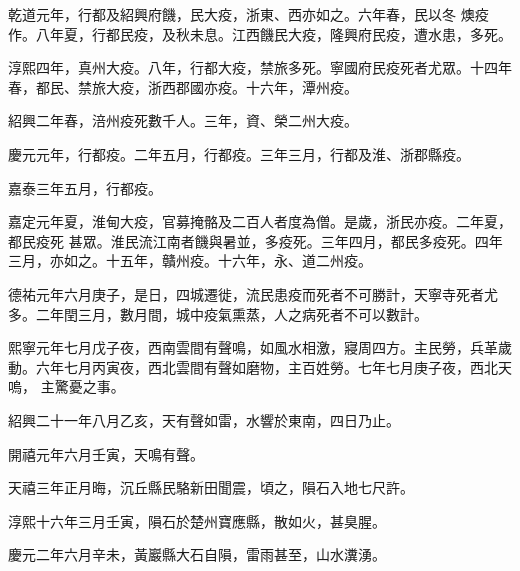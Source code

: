 \begin{pinyinscope}
 乾道元年，行都及紹興府饑，民大疫，浙東、西亦如之。六年春，民以冬
 燠疫作。八年夏，行都民疫，及秋未息。江西饑民大疫，隆興府民疫，遭水患，多死。



 淳熙四年，真州大疫。八年，行都大疫，禁旅多死。寧國府民疫死者尤眾。十四年春，都民、禁旅大疫，浙西郡國亦疫。十六年，潭州疫。



 紹興二年春，涪州疫死數千人。三年，資、榮二州大疫。



 慶元元年，行都疫。二年五月，行都疫。三年三月，行都及淮、浙郡縣疫。



 嘉泰三年五月，行都疫。



 嘉定元年夏，淮甸大疫，官募掩骼及二百人者度為僧。是歲，浙民亦疫。二年夏，都民疫死
 甚眾。淮民流江南者饑與暑並，多疫死。三年四月，都民多疫死。四年三月，亦如之。十五年，贛州疫。十六年，永、道二州疫。



 德祐元年六月庚子，是日，四城遷徙，流民患疫而死者不可勝計，天寧寺死者尤多。二年閏三月，數月間，城中疫氣熏蒸，人之病死者不可以數計。



 熙寧元年七月戊子夜，西南雲間有聲鳴，如風水相激，寢周四方。主民勞，兵革歲動。六年七月丙寅夜，西北雲間有聲如磨物，主百姓勞。七年七月庚子夜，西北天嗚，
 主驚憂之事。



 紹興二十一年八月乙亥，天有聲如雷，水響於東南，四日乃止。



 開禧元年六月壬寅，天鳴有聲。



 天禧三年正月晦，沉丘縣民駱新田聞震，頃之，隕石入地七尺許。



 淳熙十六年三月壬寅，隕石於楚州寶應縣，散如火，甚臭腥。



 慶元二年六月辛未，黃巖縣大石自隕，雷雨甚至，山水瀵湧。



\end{pinyinscope}